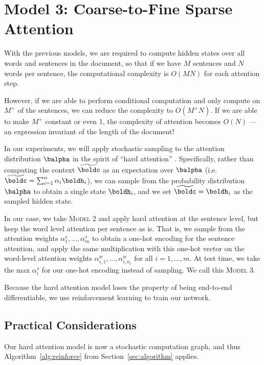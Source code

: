 \documentclass[12pt]{report}
\begin{document}
\section{Model 3: Coarse-to-Fine Sparse Attention}

With the previous models, we are required to compute hidden states over all words and sentences in the document, so that if we have $M$ sentences and $N$ words per sentence, the computational complexity is $O(MN)$ for each attention step.

However, if we are able to perform conditional computation and only compute on $M^+$ of the sentences, we can reduce the complexity to $O(M^+N)$. If we are able to make $M^+$ constant or even 1, the complexity of attention becomes $O(N)$ --- an expression invariant of the length of the document!

In our experiments, we will apply stochastic sampling to the attention distribution $\balpha$ in the spirit of ``hard attention'' \citep{xu2015captioning}.
Specifically, rather than computing the context $\widetilde{\boldc}$ as an expectation over $\balpha$ (i.e. $\widetilde{\boldc} = \sum_{i=1}^n \alpha_i \boldh_i$), we can sample from the probability distribution $\balpha$ to obtain a single state $\boldh_i$, and we set $\widetilde{\boldc} = \boldh_i$ as the sampled hidden state.

In our case, we take \textsc{Model 2} and apply hard attention at the sentence level, but keep the word level attention per sentence as is. That is, we sample from the attention weights $\alpha_1^s, \ldots, \alpha_m^s$ to obtain a one-hot encoding for the sentence attention, and apply the same multiplication with this one-hot vector on the word-level attention weights $\alpha_{i,1}^w, \ldots, \alpha_{i,n_i}^w$ for all $i = 1, \ldots, m$. At test time, we take the max $\alpha_i^s$ for our one-hot encoding instead of sampling. We call this \textsc{Model 3}.


Because the hard attention model loses the property of being end-to-end differentiable, we use reinforcement learning to train our network.


\subsection{Practical Considerations}
\label{sec:practical}

Our hard attention model is now a stochastic computation graph, and thus Algorithm~\ref{alg:reinforce} from Section~\ref{sec:algorithm} applies.
\end{document}
